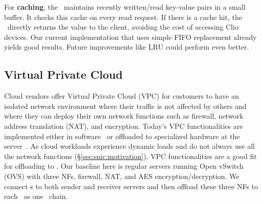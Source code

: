 For \textbf{caching}, the \snic\ maintains recently written/read key-value pairs in a small buffer. It checks this cache on every read request. If there is a cache hit, the \snic\ directly returns the value to the client, avoiding the cost of accessing Clio devices. Our current implementation that uses simple FIFO replacement already yields good results. Future improvements like LRU could perform even better.

\subsection{Virtual Private Cloud}
\label{sec:snic:vpc}

Cloud vendors offer Virtual Private Cloud (VPC) for customers to have an isolated network environment where their traffic is not affected by others and where they can deploy their own network functions such as firewall, network address translation (NAT), and encryption.
Today's VPC functionalities are implemented either in software~\cite{andromeda-google-nsdi18,ovs-nsdi15,ovs-sigcomm21} or offloaded to specialized hardware at the server~\cite{vfp-nsdi17,SmartNIC-nsdi18,aws-nitro}.
As cloud workloads experience dynamic loads and do not always use all the network functions (\S\ref{sec:snic:motivation}), VPC functionalities are a good fit for offloading to \snic.
Our baseline here is regular servers running Open vSwitch (OVS) with three NFs, firewall, NAT, and AES encryption/decryption. %
We connect \snic{}s to both sender and receiver servers and then offload these three NFs to each \snic\ as one \nt\ chain. 